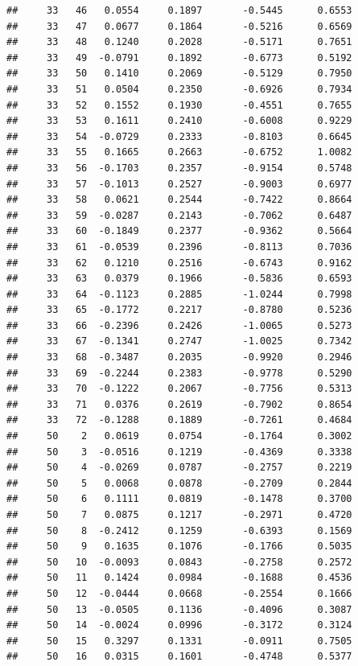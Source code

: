 \documentclass[
]{article}
\begin{document}
\begin{verbatim}
##     33   46   0.0554     0.1897       -0.5445      0.6553  
##     33   47   0.0677     0.1864       -0.5216      0.6569  
##     33   48   0.1240     0.2028       -0.5171      0.7651  
##     33   49  -0.0791     0.1892       -0.6773      0.5192  
##     33   50   0.1410     0.2069       -0.5129      0.7950  
##     33   51   0.0504     0.2350       -0.6926      0.7934  
##     33   52   0.1552     0.1930       -0.4551      0.7655  
##     33   53   0.1611     0.2410       -0.6008      0.9229  
##     33   54  -0.0729     0.2333       -0.8103      0.6645  
##     33   55   0.1665     0.2663       -0.6752      1.0082  
##     33   56  -0.1703     0.2357       -0.9154      0.5748  
##     33   57  -0.1013     0.2527       -0.9003      0.6977  
##     33   58   0.0621     0.2544       -0.7422      0.8664  
##     33   59  -0.0287     0.2143       -0.7062      0.6487  
##     33   60  -0.1849     0.2377       -0.9362      0.5664  
##     33   61  -0.0539     0.2396       -0.8113      0.7036  
##     33   62   0.1210     0.2516       -0.6743      0.9162  
##     33   63   0.0379     0.1966       -0.5836      0.6593  
##     33   64  -0.1123     0.2885       -1.0244      0.7998  
##     33   65  -0.1772     0.2217       -0.8780      0.5236  
##     33   66  -0.2396     0.2426       -1.0065      0.5273  
##     33   67  -0.1341     0.2747       -1.0025      0.7342  
##     33   68  -0.3487     0.2035       -0.9920      0.2946  
##     33   69  -0.2244     0.2383       -0.9778      0.5290  
##     33   70  -0.1222     0.2067       -0.7756      0.5313  
##     33   71   0.0376     0.2619       -0.7902      0.8654  
##     33   72  -0.1288     0.1889       -0.7261      0.4684  
##     50    2   0.0619     0.0754       -0.1764      0.3002  
##     50    3  -0.0516     0.1219       -0.4369      0.3338  
##     50    4  -0.0269     0.0787       -0.2757      0.2219  
##     50    5   0.0068     0.0878       -0.2709      0.2844  
##     50    6   0.1111     0.0819       -0.1478      0.3700  
##     50    7   0.0875     0.1217       -0.2971      0.4720  
##     50    8  -0.2412     0.1259       -0.6393      0.1569  
##     50    9   0.1635     0.1076       -0.1766      0.5035  
##     50   10  -0.0093     0.0843       -0.2758      0.2572  
##     50   11   0.1424     0.0984       -0.1688      0.4536  
##     50   12  -0.0444     0.0668       -0.2554      0.1666  
##     50   13  -0.0505     0.1136       -0.4096      0.3087  
##     50   14  -0.0024     0.0996       -0.3172      0.3124  
##     50   15   0.3297     0.1331       -0.0911      0.7505  
##     50   16   0.0315     0.1601       -0.4748      0.5377  

\end{verbatim}
\end{document}
